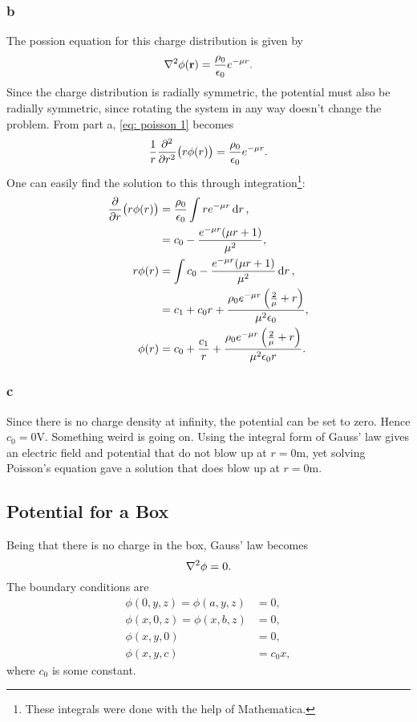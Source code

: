 \documentclass{article}
\begin{document}
\begin{multicols*}{2}
	\subsubsection*{b}
	The possion equation for this charge distribution is given by
	\begin{equation}
		\laplacian \phi(\vb{r}) = \frac{\rho_0}{\epsilon_0} e^{-\mu r}.
		\label{eq: poisson 1}
	\end{equation}
	Since the charge distribution is radially symmetric, the potential must also be radially symmetric, since rotating the system in any way doesn't change the problem.
	From part a, \ref{eq: poisson 1} becomes
	\[
		\frac{1}{r}\pdv[2]{r}(r\phi(r)) = \frac{\rho_0}{\epsilon_0} e^{-\mu r}.
	\]
	One can easily find the solution to this through integration\footnote{These integrals were done with the help of Mathematica.}:
	\begin{align*}
		\pdv{r}(r\phi(r)) &= \frac{\rho_0}{\epsilon_0} \int r e^{-\mu r}\dd{r},\\
		&= c_0-\frac{e^{-\mu r} (\mu r+1)}{\mu^2},\\
		r\phi(r) &= \int c_0-\frac{e^{-\mu r} (\mu r+1)}{\mu^2} \dd{r},\\
		&= c_1 + c_0 r + \frac{\rho_0 e^{-\mu r} \left(\frac{2}{\mu}+r\right)}{\mu^2 \epsilon_0},\\
		\phi(r) &= c_0 + \frac{c_1}{r} + \frac{\rho_0 e^{-\mu r} \left(\frac{2}{\mu}+r\right)}{\mu^2 \epsilon_0 r}.
	\end{align*}

	\subsubsection*{c}
	Since there is no charge density at infinity, the potential can be set to zero.
	Hence $c_0 = 0$V.
	Something weird is going on.
	Using the integral form of Gauss' law gives an electric field and potential that do not blow up at $r=0$m, yet solving Poisson's equation gave a solution that does blow up at $r=0$m.

	\subsection{Potential for a Box}
	Being that there is no charge in the box, Gauss' law becomes
	\begin{equation}
		\laplacian{\phi} = 0.
		\label{eq: laplace 2}
	\end{equation}
	The boundary conditions are
	\begin{align}
		\phi(0,y,z) = \phi(a,y,z) &= 0,
		\label{eq: boundary 2.1}\\
		\phi(x,0,z) = \phi(x,b,z) &= 0,
		\label{eq: boundary 2.2}\\
		\phi(x,y,0) &= 0,
		\label{eq: boundary 2.3}\\
		\phi(x,y,c) &= c_0 x,
		\label{eq: boundary 2.4}
	\end{align}
	where $c_0$ is some constant.


\end{multicols*}
\end{document}
